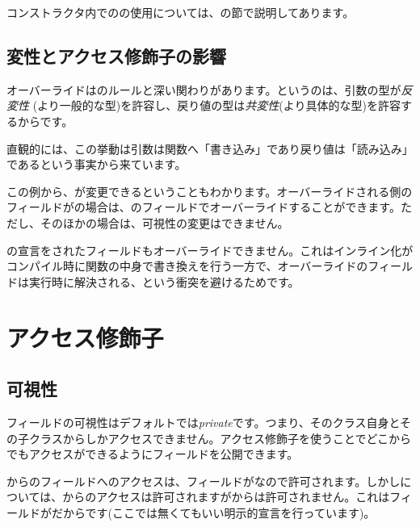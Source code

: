 
コンストラクタ内でのの使用については、の節で説明してあります。

\subsection{変性とアクセス修飾子の影響}
\label{class-field-override-effects}

オーバーライドはのルールと深い関わりがあります。というのは、引数の型が\emph{反変性} (より一般的な型)を許容し、戻り値の型は\emph{共変性}(より具体的な型)を許容するからです。


直観的には、この挙動は引数は関数へ「書き込み」であり戻り値は「読み込み」であるという事実から来ています。

この例から、が変更できるということもわかります。オーバーライドされる側のフィールドがの場合は、のフィールドでオーバーライドすることができます。ただし、そのほかの場合は、可視性の変更はできません。

の宣言をされたフィールドもオーバーライドできません。これはインライン化がコンパイル時に関数の中身で書き換えを行う一方で、オーバーライドのフィールドは実行時に解決される、という衝突を避けるためです。	
	
\section{アクセス修飾子}
\label{class-field-access-modifier}

\subsection{可視性}
\label{class-field-visibility}

フィールドの可視性はデフォルトでは\emph{private}です。つまり、そのクラス自身とその子クラスからしかアクセスできません。アクセス修飾子を使うことでどこからでもアクセスができるようにフィールドを公開できます。


からのフィールドへのアクセスは、フィールドがなので許可されます。しかしについては、からのアクセスは許可されますがからは許可されません。これはフィールドがだからです(ここでは無くてもいい明示的宣言を行っています)。


